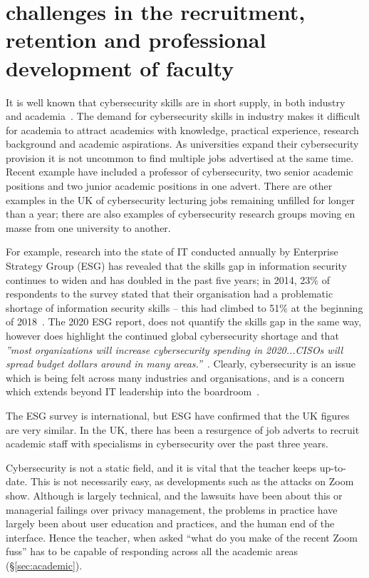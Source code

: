 \documentclass[conference]{IEEEtran}
\begin{document}
\section{challenges in the recruitment, retention and professional development of faculty}\label{sec:staff}
It is well known that cybersecurity skills are in short supply, in both industry~\cite{Ackerman2019a} and academia~\cite{schneider2013,endicott2018searching}. The demand for cybersecurity skills in industry makes it difficult for academia to attract academics with knowledge, practical experience, research background and academic aspirations. As universities expand their cybersecurity provision it is not uncommon to find multiple jobs advertised at the same time. Recent example have included a professor of cybersecurity, two senior academic positions and two junior academic positions in one advert. There are other examples in the UK of cybersecurity lecturing jobs remaining unfilled for longer than a year; there are also examples of cybersecurity research groups moving en masse from one university to another.

For example, research into the state of IT conducted annually by Enterprise Strategy Group (ESG) has revealed that the skills gap in information security continues to widen and has doubled in the past five years; in 2014, 23\% of respondents to the survey stated that their organisation had a problematic shortage of information security skills -- this had climbed to 51\% at the beginning of 2018~\cite{ESG:2018}. The 2020 ESG report, does not quantify the skills gap in the same way, however does highlight the continued global cybersecurity shortage and that {\em''most organizations will increase cybersecurity spending in 2020...CISOs will spread budget dollars around in many areas.''}~\cite[p.1]{ESG:2020}. Clearly, cybersecurity is an issue which is being felt across many industries and organisations, and is a concern which extends beyond IT leadership into the boardroom~\cite{Ackerman2019a}.

The ESG survey is international, but ESG have confirmed that the UK figures are very similar. In the UK, there has been a resurgence of job adverts to recruit academic staff with specialisms in cybersecurity over the past three years.

Cybersecurity is not a static field, and it is vital that the teacher keeps up-to-date. This is not necessarily easy, as developments such as the attacks on Zoom \cite[etc.]{MarczakScottRailton2020a} show. Although \cite{MarczakScottRailton2020a} is largely technical, and the lawsuits \cite[etc.]{Dame2020b} have been about this or managerial failings over privacy management, the problems in practice \cite{Abrams2020a,Culafi2020e} have largely been about user education and practices, and the human end of the interface. Hence the teacher, when asked ``what do you make of the recent Zoom fuss'' has to be capable of responding across all the academic areas (\S\ref{sec:academic}). 
\end{document}
